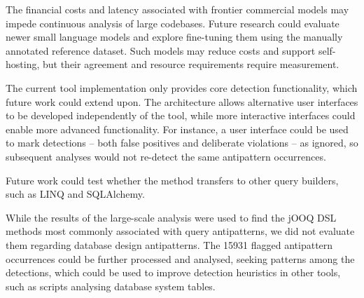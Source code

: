 The financial costs and latency associated with frontier commercial models may impede continuous analysis of large codebases. Future research could evaluate newer small language models and explore fine-tuning them using the manually annotated reference dataset. Such models may reduce costs and support self-hosting, but their agreement and resource requirements require measurement.

The current tool implementation only provides core detection functionality, which future work could extend upon. The architecture allows alternative user interfaces to be developed independently of the tool, while more interactive interfaces could enable more advanced functionality. For instance, a user interface could be used to mark detections -- both false positives and deliberate violations -- as ignored, so subsequent analyses would not re-detect the same antipattern occurrences.

Future work could test whether the method transfers to other query builders, such as LINQ and SQLAlchemy.

While the results of the large-scale analysis were used to find the jOOQ DSL methods most commonly associated with query antipatterns, we did not evaluate them regarding database design antipatterns. The \num{15931} flagged antipattern occurrences could be further processed and analysed, seeking patterns among the detections, which could be used to improve detection heuristics in other tools, such as scripts analysing database system tables.
